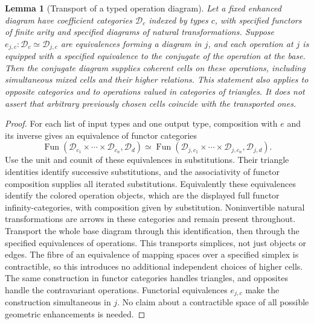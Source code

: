 \documentclass[11pt]{article}
\newtheorem{lemma}[theorem]{Lemma}
\theoremstyle{definition}
\theoremstyle{remark}
\begin{document}
\begin{lemma}[Transport of a typed operation diagram]
\label{lem:typed-operation-transport}
Let a fixed enhanced diagram have coefficient categories $\mathcal D_c$
indexed by types $c$, with specified functors of finite arity and
specified diagrams of natural transformations.  Suppose
$e_{j,c}:\mathcal D_c\simeq\mathcal D_{j,c}$ are equivalences forming
a diagram in $j$, and each operation at $j$ is equipped with a
specified equivalence to the conjugate of the operation at the base.
Then the conjugate diagram supplies coherent cells on these operations,
including simultaneous mixed cells and their higher relations.
This statement also applies to opposite categories and to operations
valued in categories of triangles.  It does not assert that arbitrary
previously chosen cells coincide with the transported ones.
\end{lemma}
\begin{proof}
For each list of input types and one output type, composition with
$e$ and its inverse gives an equivalence of functor categories
\[
 \operatorname{Fun}(\mathcal D_{c_1}\times\cdots\times
 \mathcal D_{c_n},\mathcal D_d)
 \simeq
 \operatorname{Fun}(\mathcal D_{j,c_1}\times\cdots\times
 \mathcal D_{j,c_n},\mathcal D_{j,d}).
\]
Use the unit and counit of these equivalences in substitutions.
Their triangle identities identify successive substitutions, and the
associativity of functor composition supplies all iterated substitutions.
Equivalently these equivalences identify the colored operation
objects, which are the displayed full functor infinity-categories, with
composition given by substitution.  Noninvertible natural transformations
are arrows in these categories and remain present throughout.  Transport the whole base diagram through this
identification, then through the specified equivalences of operations.
This transports simplices, not just objects or edges.  The fibre of an
equivalence of mapping spaces over a specified simplex is contractible,
so this introduces no additional independent choices of higher cells.
The same construction in functor categories handles triangles, and
opposites handle the contravariant operations.  Functorial equivalences
$e_{j,c}$ make the construction simultaneous in $j$.  No claim about
a contractible space of all possible geometric enhancements is needed.
\end{proof}
\end{document}
